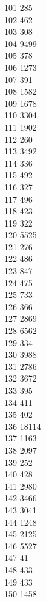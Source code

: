 { 101	285 \\
 102	462 \\
 103	308 \\
 104	9499 \\
 105	378 \\
 106	1273 \\
 107	391 \\
 108	1582 \\
 109	1678 \\
 110	3304 \\
 111	1902 \\
 112	260 \\
 113	3492 \\
 114	336 \\
 115	492 \\
 116	327 \\
 117	496 \\
 118	423 \\
 119	322 \\
 120	5525 \\
 121	276 \\
 122	486 \\
 123	847 \\
 124	475 \\
 125	733 \\
 126	366 \\
 127	2869 \\
 128	6562 \\
 129	334 \\
 130	3988 \\
 131	2786 \\
 132	3672 \\
 133	395 \\
 134	411 \\
 135	402 \\
 136	18114 \\
 137	1163 \\
 138	2097 \\
 139	252 \\
 140	428 \\
 141	2980 \\
 142	3466 \\
 143	3041 \\
 144	1248 \\
 145	2125 \\
 146	5527 \\
 147	41 \\
 148	433 \\
 149	433 \\
 150	1458 \\
}
